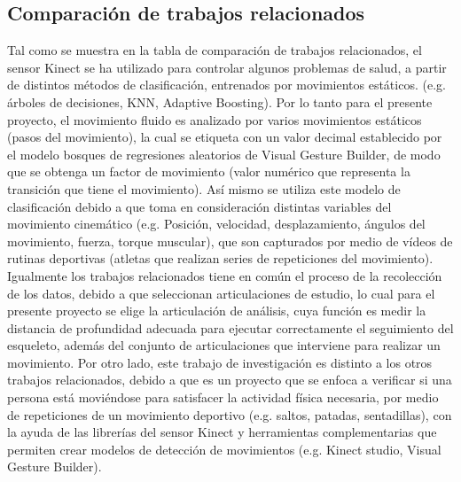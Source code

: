 \subsection{Comparaci\'on de trabajos relacionados} \label{tr:10}
Tal como se muestra en la tabla de comparaci\'on de trabajos relacionados, el sensor Kinect se ha utilizado para controlar algunos problemas de salud, a partir de distintos m\'etodos de clasificaci\'on, entrenados por  movimientos est\'aticos. (e.g. \'arboles de decisiones, KNN, Adaptive Boosting). Por lo tanto para el presente proyecto, el movimiento fluido es analizado por varios movimientos est\'aticos (pasos del movimiento), la cual se etiqueta con un valor decimal establecido por el modelo bosques de regresiones aleatorios de Visual Gesture Builder, de modo que se obtenga un factor de movimiento (valor num\'erico que representa la transici\'on que tiene el movimiento). As\'i mismo se utiliza este modelo de clasificaci\'on debido a que toma en consideraci\'on distintas variables del movimiento cinem\'atico (e.g. Posici\'on, velocidad, desplazamiento, \'angulos del movimiento, fuerza, torque muscular), que son capturados por medio de v\'ideos de rutinas deportivas (atletas que realizan series de repeticiones del movimiento).
\medbreak
Igualmente los trabajos relacionados tiene en com\'un el proceso de la recolecci\'on de los datos, debido a que seleccionan articulaciones de estudio, lo cual para el presente proyecto se elige la articulaci\'on de an\'alisis, cuya funci\'on es medir la distancia de profundidad adecuada para ejecutar correctamente el seguimiento del esqueleto, adem\'as del conjunto de articulaciones que interviene para realizar un movimiento.
\medbreak
Por otro lado, este trabajo de investigaci\'on es distinto a los otros trabajos relacionados, debido a que es un proyecto que se enfoca a verificar si una persona est\'a movi\'endose para satisfacer la actividad f\'isica necesaria, por medio de repeticiones de un movimiento deportivo (e.g. saltos, patadas, sentadillas), con la ayuda de las librer\'ias del sensor Kinect y herramientas complementarias que permiten crear modelos de detecci\'on de movimientos (e.g. Kinect studio, Visual Gesture Builder).
